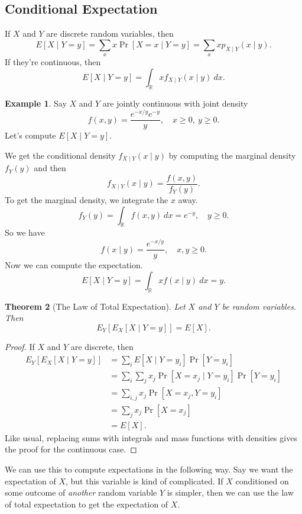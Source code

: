 \documentclass[12pt]{article}
\theoremstyle{plain}
\newtheorem{theorem}{Theorem}[section]
\theoremstyle{definition}
\newtheorem{example}[theorem]{Example}
\theoremstyle{remark}
\newcommand{\R}{\mathbb{R}}
\begin{document}
\subsection{Conditional Expectation}
If $X$ and $Y$ are discrete random variables, then
\[
E[X\mid Y = y] = \sum _x x \Pr[X = x\mid Y = y] = \sum_x x p_{X\mid Y}(x\mid y).
\]
If they're continuous, then
\[
    E[X\mid Y = y] = \int_\R xf_{X\mid Y}(x\mid y)\ dx.
\]

\begin{example}
    Say $X$ and $Y$ are jointly continuous with joint density
    \[
        f(x,y) = \frac{e^{-x/y}e^{-y}}{y},\quad x\geq 0,\ y\geq 0.
    \]
    Let's compute $E[X\mid Y = y]$.

    We get the conditional density $f_{X\mid Y}(x\mid y)$ by computing the marginal density $f_Y(y)$ and then
    \[
        f_{X\mid Y}(x\mid y) = \frac{f(x,y)}{f_Y(y)}.
    \]
    To get the marginal density, we integrate the $x$ away.
    \[
        f_Y(y) = \int_\R f(x,y)\ dx= e^{-y},\quad y\geq 0.
    \]
    So we have
    \[
        f(x\mid y) = \frac{e^{-x/y}}{y},\quad x,y\geq 0.
    \]
    Now we can compute the expectation.
    \[
        E[X\mid Y = y] = \int_\R x f(x\mid y)\ dx = y.
    \]
\end{example}


\begin{theorem}[The Law of Total Expectation]
Let $X$ and $Y$ be random variables.
Then
\[
    E_Y[E_X[X\mid Y = y]] = E[X].
\]
\end{theorem}
\begin{proof}
    If $X$ and $Y$ are discrete, then
    \begin{align*}
        E_Y[E_X[X\mid Y = y]] &= \sum_iE[X\mid Y = y_i]\Pr[Y = y_i]\\
        &= \sum_i\sum_jx_j\Pr[X = x_j\mid Y = y_i]\Pr[Y = y_i]\\
        &= \sum_{i,j} x_j \Pr[X = x_j, Y = y_i]\\
        &= \sum_j x_j\Pr[X = x_j]\\
        &= E[X].
    \end{align*}
    Like usual, replacing sums with integrals and mass functions with densities gives the proof for the continuous case.
\end{proof}

We can use this to compute expectations in the following way.
Say we want the expectation of $X$, but this variable is kind of complicated.
If $X$ conditioned on some outcome of \emph{another} random variable $Y$ is simpler, then we can use the law of total expectation to get the expectation of $X$.
\end{document}
